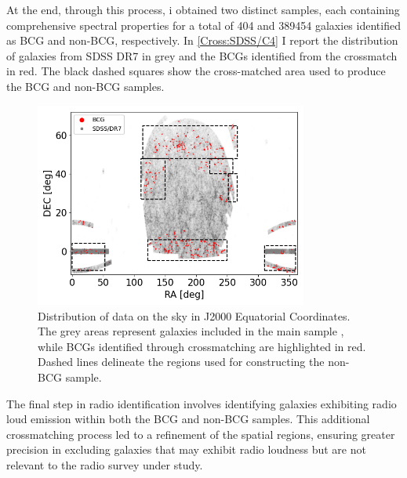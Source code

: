 At the end, through this process, i obtained two distinct samples, each containing comprehensive spectral properties for a total of 404 and 389454 galaxies identified as BCG and non-BCG, respectively. 
In \autoref{Cross:SDSS/C4} I report the distribution of galaxies from SDSS DR7 in grey and the BCGs identified from the crossmatch in red. The black dashed squares show the cross-matched area used to produce the BCG and non-BCG samples.

\begin{figure}[hbtp]
  \centering
  \includegraphics[width=0.8\textwidth]{BCGcmSDSS}
  \caption{Distribution of data on the sky in J2000 Equatorial Coordinates. The grey areas represent galaxies included in the main sample \cite{mpa-sdss-dr7}, while BCGs identified through crossmatching are highlighted in red. Dashed lines delineate the regions used for constructing the non-BCG sample. }
  \label{Cross:SDSS/C4}
\end{figure}

The final step in radio identification involves identifying galaxies exhibiting radio loud emission within both the BCG and non-BCG samples. This additional crossmatching process led to a refinement of the spatial regions, ensuring greater precision in excluding galaxies that may exhibit radio loudness but are not relevant to the radio survey under study.


